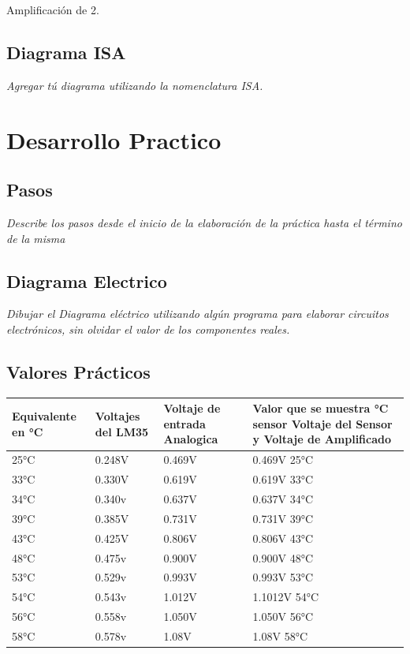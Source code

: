\documentclass[11pt]{scrartcl}
\newcommand{\indicacion}[1]{\noindent\textit{\small #1}}
\begin{document}
Amplificación de 2.





\subsection{Diagrama ISA}
\indicacion{
    Agregar tú diagrama utilizando la nomenclatura ISA.
}


\section{Desarrollo Practico}

\subsection{Pasos}
\indicacion{
    Describe los pasos desde el inicio de la elaboración de la práctica hasta el término de la misma
}

\subsection{Diagrama Electrico}
\indicacion{
    Dibujar el Diagrama eléctrico utilizando algún programa para elaborar circuitos electrónicos, sin olvidar el valor de los componentes reales.
}



\subsection{Valores Prácticos}
\begin{center}
\begin{tabular}{|p{4cm}|p{4cm}|p{4cm}|p{4cm}|}
\hline
\textbf{Equivalente en °C}& \textbf{Voltajes del LM35} & \textbf{Voltaje de entrada Analogica} & \textbf{Valor que se muestra °C sensor Voltaje del Sensor y Voltaje de Amplificado}\\
\hline
25°C& 0.248V & 0.469V & 0.469V 25°C\\
\hline
33°C& 0.330V& 0.619V& 0.619V 33°C \\[4px]
\hline
34°C& 0.340v& 0.637V& 0.637V 34°C\\[4px]
\hline
39°C& 0.385V& 0.731V& 0.731V 39°C\\[4px]
\hline
43°C & 0.425V& 0.806V& 0.806V 43°C\\[4px]
\hline
48°C& 0.475v& 0.900V& 0.900V 48°C\\[4px]
\hline
53°C & 0.529v& 0.993V& 0.993V 53°C\\[4px]
\hline
54°C & 0.543v& 1.012V& 1.1012V 54°C\\[4px]
\hline
56°C &0.558v & 1.050V& 1.050V 56°C\\[4px]
\hline
58°C& 0.578v& 1.08V& 1.08V 58°C\\[4px]
\hline
\end{tabular}
\end{center}
\end{document}
